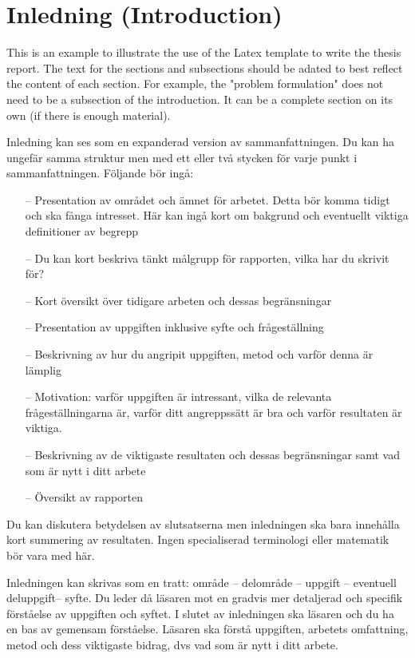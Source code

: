 \section{Inledning (Introduction)}
\label{sec:intro}

This is an example to illustrate the use of the Latex template to write the thesis report. The text for the sections and subsections should be adated to best reflect the content of each section. For example, the "problem formulation" does not need to be a subsection of the introduction. It can be a complete
section on its own (if there is enough material). 

Inledning kan ses som en expanderad version av sammanfattningen. Du kan ha ungef\"{a}r samma struktur men med ett eller tv\r{a} stycken f\"{o}r varje punkt i sammanfattningen. F\"{o}ljande b\"{o}r ing\r{a}:
\begin{itemize}
\item[--]	Presentation av omr\r{a}det och \"{a}mnet f\"{o}r arbetet. Detta b\"{o}r komma tidigt och ska f\r{a}nga intresset. H\"{a}r kan ing\r{a} kort om bakgrund och eventuellt viktiga definitioner av begrepp
\item[--]	Du kan kort beskriva t\"{a}nkt m\r{a}lgrupp f\"{o}r rapporten, vilka har du skrivit f\"{o}r?
\item[--]	Kort \"{o}versikt \"{o}ver tidigare arbeten och dessas begr\"{a}nsningar 
\item[--]	Presentation av uppgiften inklusive syfte och fr\r{a}gest\"{a}llning
\item[--]	Beskrivning av hur du angripit uppgiften, metod och varf\"{o}r denna \"{a}r l\"{a}mplig
\item[--]	Motivation: varf\"{o}r uppgiften \"{a}r intressant, vilka de relevanta fr\r{a}gest\"{a}llningarna \"{a}r, varf\"{o}r ditt angreppss\"{a}tt \"{a}r bra och varf\"{o}r resultaten \"{a}r viktiga.
\item[--]	Beskrivning av de viktigaste resultaten och dessas begr\"{a}nsningar samt vad som \"{a}r nytt i ditt arbete
\item[--]	\"{O}versikt av rapporten
\end{itemize}

Du kan diskutera betydelsen av slutsatserna men inledningen ska bara inneh\r{a}lla kort summering av resultaten. Ingen specialiserad terminologi eller matematik b\"{o}r vara med h\"{a}r. 

Inledningen kan skrivas som en tratt: omr\r{a}de – delomr\r{a}de – uppgift – eventuell deluppgift– syfte. Du leder d\r{a} l\"{a}saren mot en gradvis mer detaljerad och specifik f\"{o}rst\r{a}else av uppgiften och syftet. I slutet av inledningen ska l\"{a}saren och du ha en bas av gemensam f\"{o}rst\r{a}else. L\"{a}saren ska f\"{o}rst\r{a} uppgiften, arbetets omfattning, metod och dess viktigaste bidrag, dvs vad som \"{a}r nytt i ditt arbete. 

